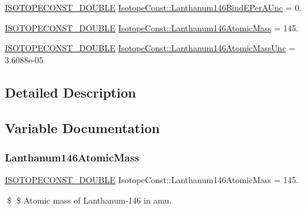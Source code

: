 \begin{DoxyCompactItemize}
\mbox{\hyperlink{group___isotope_const-_macros_ga8f45a7272ce02c0b4c65c44636ed719a}{I\+S\+O\+T\+O\+P\+E\+C\+O\+N\+S\+T\+\_\+\+D\+O\+U\+B\+LE}} \mbox{\hyperlink{group___isotope_const-_lanthanum-_la146_ga2e9bbd1dab6eb0ec16f0d311521679dd}{Isotope\+Const\+::\+Lanthanum146\+Bind\+E\+Per\+A\+Unc}} = 0.
\item 
\mbox{\hyperlink{group___isotope_const-_macros_ga8f45a7272ce02c0b4c65c44636ed719a}{I\+S\+O\+T\+O\+P\+E\+C\+O\+N\+S\+T\+\_\+\+D\+O\+U\+B\+LE}} \mbox{\hyperlink{group___isotope_const-_lanthanum-_la146_ga1999a9c4e125743ed842694ca0015f12}{Isotope\+Const\+::\+Lanthanum146\+Atomic\+Mass}} = 145.
\item 
\mbox{\hyperlink{group___isotope_const-_macros_ga8f45a7272ce02c0b4c65c44636ed719a}{I\+S\+O\+T\+O\+P\+E\+C\+O\+N\+S\+T\+\_\+\+D\+O\+U\+B\+LE}} \mbox{\hyperlink{group___isotope_const-_lanthanum-_la146_gaa83b99a2339905ef93a92adcd98d03cf}{Isotope\+Const\+::\+Lanthanum146\+Atomic\+Mass\+Unc}} = 3.\+6088e-\/05
\end{DoxyCompactItemize}


\subsection{Detailed Description}


\subsection{Variable Documentation}
\mbox{\label{group___isotope_const-_lanthanum-_la146_ga1999a9c4e125743ed842694ca0015f12}} 
\subsubsection{\texorpdfstring{Lanthanum146\+Atomic\+Mass}{Lanthanum146AtomicMass}}
{\footnotesize\ttfamily \mbox{\hyperlink{group___isotope_const-_macros_ga8f45a7272ce02c0b4c65c44636ed719a}{I\+S\+O\+T\+O\+P\+E\+C\+O\+N\+S\+T\+\_\+\+D\+O\+U\+B\+LE}} Isotope\+Const\+::\+Lanthanum146\+Atomic\+Mass = 145.}

\$ \$ Atomic mass of Lanthanum-\/146 in amu. \mbox{\label{group___isotope_const-_lanthanum-_la146_gaa83b99a2339905ef93a92adcd98d03cf}} 
